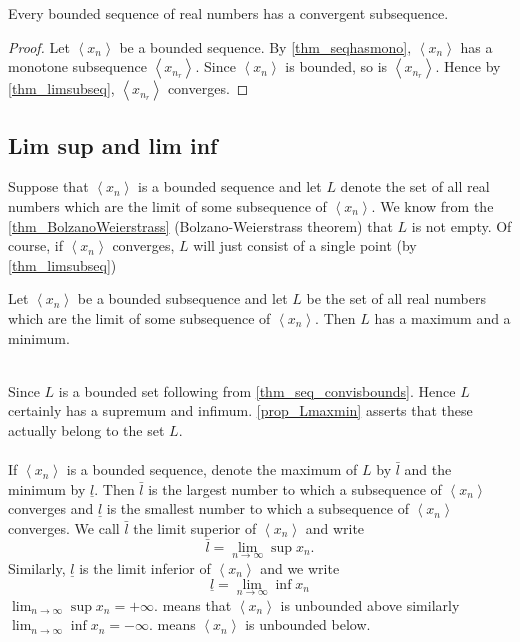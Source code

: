 \documentclass[10pt, a4paper]{article}
\newcommand{\seq}[1][x_n]{\left\langle #1 \right\rangle}
\begin{document}
\begin{theorem}\label{thm_BolzanoWeierstrass}
    Every bounded sequence of real numbers has a convergent subsequence.
    \begin{proof}
        Let $\seq$ be a bounded sequence. By \autoref{thm_seqhasmono}, $\seq$ has a monotone subsequence $\seq[x_{n_r}]$. Since $\seq$ is bounded, so is $\seq[x_{n_r}]$. Hence by \autoref{thm_limsubseq}, $\seq[x_{n_r}]$ converges.
    \end{proof}
\end{theorem}

\subsection{Lim sup and lim inf}
Suppose that $\seq$ is a bounded sequence and let $L$ denote the set of all real numbers which are the limit of some subsequence of $\seq$. We know from the \autoref{thm_BolzanoWeierstrass} (Bolzano-Weierstrass theorem) that $L$ is not empty. Of course, if $\seq$ converges, $L$ will just consist of a single point (by \autoref{thm_limsubseq})

\begin{proposition}\label{prop_Lmaxmin}
    Let $\seq$ be a bounded subsequence and let $L$ be the set of all real numbers which are the limit of some subsequence of $\seq$. Then $L$ has a maximum and a minimum.
\end{proposition}
\phantom{}
\\
Since $L$ is a bounded set following from \autoref{thm_seq_convisbounds}. Hence $L$ certainly has a supremum and infimum. \autoref{prop_Lmaxmin} asserts that these actually belong to the set $L$. \\
\\
If $\seq$ is a bounded sequence, denote the maximum of $L$ by $\bar{l}$ and the minimum by $\underline{l}$. Then $\bar{l}$ is the largest number to which a subsequence of $\seq$ converges and $\underline{l}$ is the smallest number to which a subsequence of $\seq$ converges. We call $\bar{l}$ the limit superior of $\seq$ and write
$$\bar{l} = \displaystyle \lim_{n \rightarrow \infty} \sup{x_n}.$$
Similarly, $\underline{l}$ is the limit inferior of $\seq$ and we write
$$\underline{l} = \displaystyle \lim_{n \rightarrow \infty} \inf{x_n}$$
$\displaystyle \lim_{n \rightarrow \infty} \sup{x_n} = + \infty.$ means that $\seq$ is unbounded above similarly $\displaystyle \lim_{n \rightarrow \infty} \inf{x_n} = - \infty.$ means $\seq$ is unbounded below.
\end{document}
